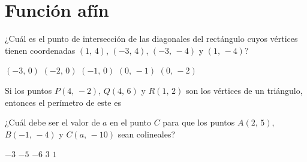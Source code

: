 \documentclass[sin nombre]{srs2}
\begin{document}
\section{Función afín}
\begin{preguntas}
\pregunta ¿Cuál es el punto de intersección de las diagonales del rectángulo cuyos vértices tienen coordenadas $\left(1,\,4\right)$, $\left(-3,\,4\right)$, $\left(-3,\,-4\right)$ y $\left(1,\,-4\right)$?
\begin{alternativas}
\alternativa $\left(-3,\,0\right)$
\alternativa $\left(-2,\,0\right)$
\alternativa $\left(-1,\,0\right)$
\alternativa $\left(0,\,-1\right)$
\alternativa $\left(0,\,-2\right)$
\end{alternativas}

\pregunta Si los puntos $P\left(4,\,-2\right)$, $Q\left(4,\,6\right)$ y $R\left(1,\,2\right)$ son los vértices de un triángulo, entonces el perímetro de este es
\begin{alternativas}
\end{alternativas}

\pregunta ¿Cuál debe ser el valor de $a$ en el punto $C$ para que los puntos $A\left(2,\,5\right)$, $B\left(-1,\,-4\right)$ y $C\left(a,\,-10\right)$ sean colineales?
\begin{alternativas}
\alternativa $-3$
\alternativa $-5$
\alternativa $-6$
\alternativa $3$
\alternativa $1$
\end{alternativas}


\end{preguntas}
\end{document}
